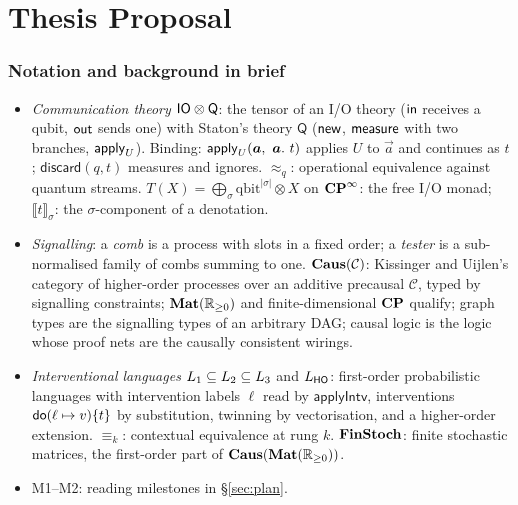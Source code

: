\part{Thesis Proposal}

\section*{Notation and background in brief}
\begin{itemize}[nosep]
\item \emph{Communication theory} $\mathsf{IO}\otimes\mathsf{Q}$: the tensor of an I/O theory ($\mathsf{in}$ receives a qubit, $\mathsf{out}$ sends one) with Staton's theory $\mathsf{Q}$ ($\mathsf{new}$, $\mathsf{measure}$ with two branches, $\mathsf{apply}_{U}$). Binding: $\mathsf{apply}_{U}(\bm a,\ \bm a.\ t)$ applies $U$ to $\vec a$ and continues as $t$; $\mathsf{discard}(q, t)$ measures and ignores. $\approx_q$: operational equivalence against quantum streams. $T(X)=\bigoplus_\sigma \mathrm{qbit}^{|\sigma|}\otimes X$ on $\mathbf{CP}^{\infty}$: the free I/O monad; $\llbracket t\rrbracket_\sigma$: the $\sigma$-component of a denotation.
\item \emph{Signalling}: a \emph{comb} is a process with slots in a fixed order; a \emph{tester} is a sub-normalised family of combs summing to one. $\mathbf{Caus}(\mathcal{C})$: Kissinger and Uijlen's category of higher-order processes over an additive precausal $\mathcal{C}$, typed by signalling constraints; $\mathbf{Mat}(\mathbb{R}_{\geq 0})$ and finite-dimensional $\mathbf{CP}$ qualify; graph types \cite{simmons2024thesis} are the signalling types of an arbitrary DAG; causal logic \cite{simmons2024thesis,simmons2024completelogic} is the logic whose proof nets are the causally consistent wirings.
\item \emph{Interventional languages} $L_{1}\subseteq L_{2}\subseteq L_{3}$ and $L_{\mathsf{HO}}$: first-order probabilistic languages with intervention labels $\ell$ read by $\mathsf{applyIntv}$, interventions $\mathsf{do}(\ell\mapsto v)\{t\}$ by substitution, twinning by vectorisation, and a higher-order extension. $\equiv_k$: contextual equivalence at rung $k$. $\mathbf{FinStoch}$: finite stochastic matrices, the first-order part of $\mathbf{Caus}(\mathbf{Mat}(\mathbb{R}_{\geq 0}))$.
\item M1--M2: reading milestones in \S\ref{sec:plan}.
\end{itemize}

